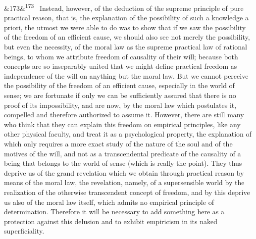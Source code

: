 \documentclass[12pt]{article}
\newcommand{\para}[1][]{\par\noindent\ifx&#1&\else\textsuperscript{\footnotesize #1}~\fi}
\begin{document}
\para[173] Instead, however, of the deduction of the supreme principle of pure practical reason, that is, the explanation of the possibility of such a knowledge a priori, the utmost we were able to do was to show that if we saw the possibility of the freedom of an efficient cause, we should also see not merely the possibility, but even the necessity, of the moral law as the supreme practical law of rational beings, to whom we attribute freedom of causality of their will; because both concepts are so inseparably united that we might define practical freedom as independence of the will on anything but the moral law. But we cannot perceive the possibility of the freedom of an efficient cause, especially in the world of sense; we are fortunate if only we can be sufficiently assured that there is no proof of its impossibility, and are now, by the moral law which postulates it, compelled and therefore authorized to assume it. However, there are still many who think that they can explain this freedom on empirical principles, like any other physical faculty, and treat it as a psychological property, the explanation of which only requires a more exact study of the nature of the soul and of the motives of the will, and not as a transcendental predicate of the causality of a being that belongs to the world of sense (which is really the point). They thus deprive us of the grand revelation which we obtain through practical reason by means of the moral law, the revelation, namely, of a supersensible world by the realization of the otherwise transcendent concept of freedom, and by this deprive us also of the moral law itself, which admits no empirical principle of determination. Therefore it will be necessary to add something here as a protection against this delusion and to exhibit empiricism in its naked superficiality.
\end{document}
